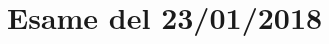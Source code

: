 \documentclass[\main/main.tex]{subfiles}
\begin{document}
\section{Esame del 23/01/2018}

% 
\clearpage

\clearpage

\end{document}
